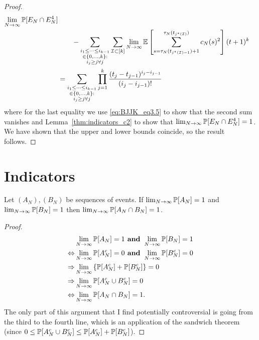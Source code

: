 \begin{proof}
\begin{align*}
        \lim_{N\to\infty}\mathbb{P}[E_N \cap E_N^4] \notag\\
    &\qquad- \sum_{\substack{i_1\leq \dots\leq i_{k-1}\\ \in \{0,\dots,k\} 
        :\\ i_j \geq j \forall j}}
        \sum_{\mathcal{I} \subset [k]}
        \lim_{N\to\infty} \mathbb{E} \left[ \sum_{s=\tau_N(t_{j^\star(\mathcal{I}) -1})+1}^{\tau_N(t_{j^\star(\mathcal{I}) })}         
        c_N(s)^2 \right] ( t+1 )^k \notag\\
&= \sum_{\substack{i_1\leq \dots\leq i_{k-1}\\ \in \{0,\dots,k\} 
        :\\ i_j \geq j \forall j}}
        \prod_{j=1}^k \frac{(t_j - t_{j-1})^{i_j - i_{j-1}}}{(i_j - i_{j-1})!}
\end{align*}
where for the last equality we use \eqref{eq:BJJK_eq3.5} to show that the second sum vanishes and Lemma~\ref{thm:indicators_c2} to show that $\lim_{N\to\infty}\mathbb{P}[E_N \cap E_N^4] =1$.
We have shown that the upper and lower bounds coincide, so the result follows.
\end{proof}






\section{Indicators \seb{$\checkmark$} }
 
\begin{lemma}\label{thm:lim_AandB}
Let $(A_N) , (B_N)$ be sequences of events. 
If $\lim_{N\to\infty}\mathbb{P}[A_N] =1$ and $\lim_{N\to\infty}\mathbb{P}[B_N]=1$ then $\lim_{N\to\infty} \mathbb{P} [A_N \cap B_N] =1$.
\end{lemma}

\begin{proof}
\begin{align*}
&\lim_{N\to\infty} \mathbb{P}[A_N] =1 \textbf{ and } 
        \lim_{N\to\infty} \mathbb{P}[B_N] =1 \notag\\
\Leftrightarrow &\lim_{N\to\infty} \mathbb{P}[A_N^c] =0 \textbf{ and } 
        \lim_{N\to\infty} \mathbb{P}[B_N^c] =0 \notag\\
\Rightarrow &\lim_{N\to\infty} \left\{ \mathbb{P}[A_N^c] 
        + \mathbb{P}[B_N^c] \right\} =0 \notag\\
\Rightarrow &\lim_{N\to\infty} \mathbb{P}[A_N^c \cup B_N^c] =0 \notag\\
\Leftrightarrow &\lim_{N\to\infty} \mathbb{P}[ A_N \cap B_N ] =1.
\end{align*}
The only part of this argument that I find potentially controversial is going from the third to the fourth line, which is an application of the sandwich theorem (since $0 \leq \mathbb{P}[A_N^c \cup B_N^c] \leq \mathbb{P}[A_N^c] + \mathbb{P}[B_N^c]$).
\end{proof}

